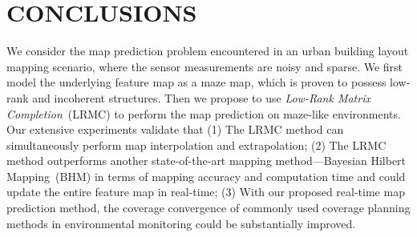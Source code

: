 \section{CONCLUSIONS}
We consider the map prediction problem encountered in an urban building layout mapping scenario, where the sensor measurements are noisy and sparse. We first model the underlying feature map as a maze map, which is proven to possess low-rank and incoherent structures. Then we propose to use \textit{Low-Rank Matrix Completion}~(LRMC) to perform the map prediction on maze-like environments. Our extensive experiments validate that (1) The LRMC method can simultaneously perform map interpolation and extrapolation; (2) The LRMC method outperforms another state-of-the-art mapping method---Bayesian Hilbert Mapping~(BHM) in terms of mapping accuracy and computation time and could update the entire feature map in real-time; (3) With our proposed real-time map prediction method, the coverage convergence of commonly used coverage planning methods in environmental monitoring could be substantially improved. 